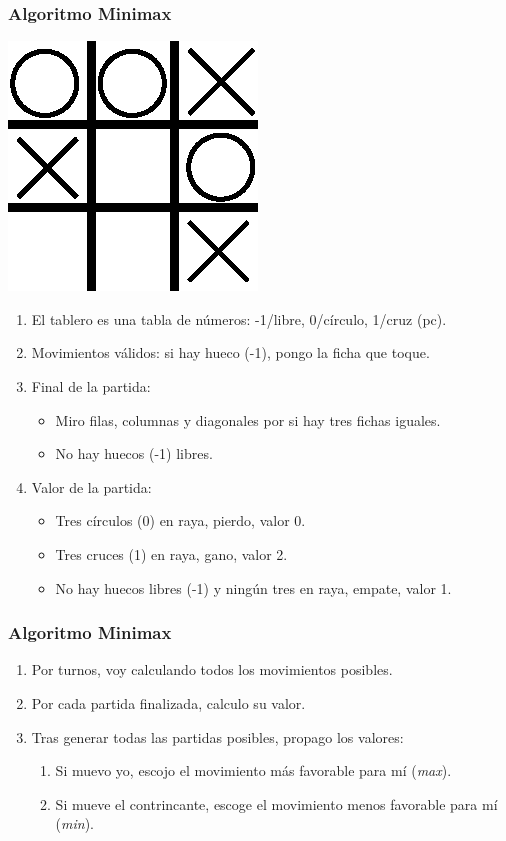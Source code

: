 \documentclass[a4paper,t,xcolor=pst,dvips,colortheme]{beamer}
\begin{document}
\begin{frame}[c]
    \frametitle{Algoritmo Minimax}
    \begin{center}
        \includegraphics[width=0.15\linewidth]{images/minimax/tresEnRaya.eps}
    \end{center}
    \begin{enumerate}[<+->]
        \item El tablero es una tabla de números: -1/libre, 0/círculo, 1/cruz (pc).
        \item Movimientos válidos: si hay hueco (-1), pongo la ficha que toque.
        \item Final de la partida:
            \begin{itemize}
                \item Miro filas, columnas y diagonales por si hay tres fichas iguales.
                \item No hay huecos (-1) libres.
            \end{itemize}
        \item Valor de la partida:
            \begin{itemize}
                \item Tres círculos (0) en raya, pierdo, valor 0.
                \item Tres cruces (1) en raya, gano, valor 2.
                \item No hay huecos libres (-1) y ningún tres en raya, empate, valor 1.
            \end{itemize}
    \end{enumerate}
\end{frame}

\begin{frame}[c]
    \frametitle{Algoritmo Minimax}
    \begin{enumerate}[<+->]
        \item Por turnos, voy calculando todos los movimientos posibles.
        \item Por cada partida finalizada, calculo su valor.
        \item Tras generar todas las partidas posibles, propago los valores:
        \begin{enumerate}
            \item Si muevo yo, escojo el movimiento más favorable para mí (\emph{max}).
            \item Si mueve el contrincante, escoge el movimiento menos favorable para mí (\emph{min}).
        \end{enumerate}
    \end{enumerate}
\end{frame}
\end{document}
